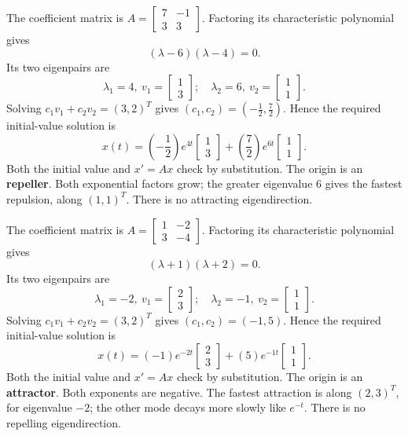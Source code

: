 The coefficient matrix is $A=\left[\begin{matrix}7 & -1\\3 & 3\end{matrix}\right]$.
Factoring its characteristic polynomial gives
\[\left(\lambda - 6\right) \left(\lambda - 4\right)=0.\]
Its two eigenpairs are
\[\lambda_1=4,\ v_1=\left[\begin{matrix}1\\3\end{matrix}\right];\quad
\lambda_2=6,\ v_2=\left[\begin{matrix}1\\1\end{matrix}\right].\]
Solving $c_1v_1+c_2v_2=(3,2)^T$ gives
$(c_1,c_2)=(- \frac{1}{2},\frac{7}{2})$.
Hence the required initial-value solution is
\[x(t)=\left(- \frac{1}{2}\right)e^{4t}\left[\begin{matrix}1\\3\end{matrix}\right]+\left(\frac{7}{2}\right)e^{6t}\left[\begin{matrix}1\\1\end{matrix}\right].\]
Both the initial value and $x'=Ax$ check by substitution.
The origin is an \textbf{repeller}.
Both exponential factors grow; the greater eigenvalue $6$ gives
the fastest repulsion, along $(1,1)^T$. There is no attracting
eigendirection.

The coefficient matrix is $A=\left[\begin{matrix}1 & -2\\3 & -4\end{matrix}\right]$.
Factoring its characteristic polynomial gives
\[\left(\lambda + 1\right) \left(\lambda + 2\right)=0.\]
Its two eigenpairs are
\[\lambda_1=-2,\ v_1=\left[\begin{matrix}2\\3\end{matrix}\right];\quad
\lambda_2=-1,\ v_2=\left[\begin{matrix}1\\1\end{matrix}\right].\]
Solving $c_1v_1+c_2v_2=(3,2)^T$ gives
$(c_1,c_2)=(-1,5)$.
Hence the required initial-value solution is
\[x(t)=\left(-1\right)e^{-2t}\left[\begin{matrix}2\\3\end{matrix}\right]+\left(5\right)e^{-1t}\left[\begin{matrix}1\\1\end{matrix}\right].\]
Both the initial value and $x'=Ax$ check by substitution.
The origin is an \textbf{attractor}.
Both exponents are negative. The fastest attraction is along
$(2,3)^T$, for eigenvalue $-2$; the other mode decays more slowly
like $e^{-t}$. There is no repelling eigendirection.

